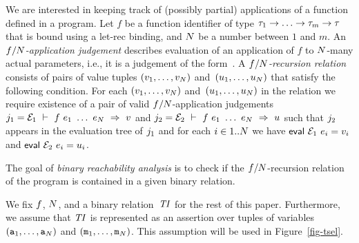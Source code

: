 We are interested in keeping track of (possibly partial) applications
of a function defined in a program.
Let $f$ be a function identifier of type $\type[1] \rightarrow \ldots
\rightarrow \type[m] \rightarrow \type$ that is bound using a let-rec
binding, and $\theArity$ be a number between $1$ and $m$.  
An \emph{$\theFunction/\theArity$-application judgement} describes evaluation of
an application of $f$ to $\theArity$-many actual parameters, i.e., it
is a judgement of the form~.
A \emph{$\theFunction/\theArity$-recursion relation} consists of pairs
of value tuples $(v_1, \dots, v_\theArity)$ and~$(u_1, \dots,
u_\theArity)$ that satisfy the following condition.
For each $(v_1, \dots, v_\theArity)$ and~$(u_1, \dots, u_\theArity)$
in the relation we require existence of a pair of valid
$\theFunction/\theArity$-application judgements $\evjvar[1] =
\evj{\ectx[1]}{f\ \expr[1]\ \ldots\ \expr[\theArity]}{\val[]}$ and
$\evjvar[2] = \evj{\ectx[2]}{f\ \expr[1]\ \ldots\
\expr[\theArity]}{u}$ such that $\evjvar[2]$ appears in the evaluation
tree of $\evjvar[1]$ and for each $i \in 1..\theArity$ we have
$\tsf{eval}\ \ectx[1]\ \expr[i] = \val[i]$ and $\tsf{eval}\ \ectx[2]\
\expr[i] = u_i$.

The goal of \emph{binary reachability analysis} is to check if the
$\theFunction/\theArity$-recursion relation of the program is
contained in a given binary relation.

We fix $\theFunction$, $\theArity$, and a binary relation~$\theTI$ for
the rest of this paper.
Furthermore, we assume that $\theTI$ is represented as an assertion
over tuples of variables $(\mathtt{a}_1, \dots, \mathtt{a}_\theArity)$
and $(\mathtt{m}_1, \dots, \mathtt{m}_\theArity)$.
This assumption will be used in Figure~\ref{fig-tsel}.




